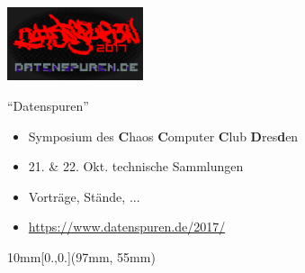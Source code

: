 \documentclass[t]{beamer}
\begin{document}
\begin{frame}[label=ct6]{\color{fg}{Anschlusskommunikation (1)}}
 
 
 \begin{center}

 \includegraphics[width=4cm]{img-src/datenspuren}
  \end{center}
  
  
  "`Datenspuren"'
  \begin{itemize}
   \item Symposium des \textbf{C}haos \textbf{C}omputer \textbf{C}lub \textbf{D}res\textbf{d}en
   \item 21. \& 22. Okt. \pause technische Sammlungen
   \item Vorträge, Stände, ...
   \smallskip
   \item \url{https://www.datenspuren.de/2017/}
   
  \end{itemize}
  
  
  
\begin{textblock*}{10mm}[0.,0.](97mm, 55mm)
\end{textblock*}

  
 
\end{frame}
\end{document}
